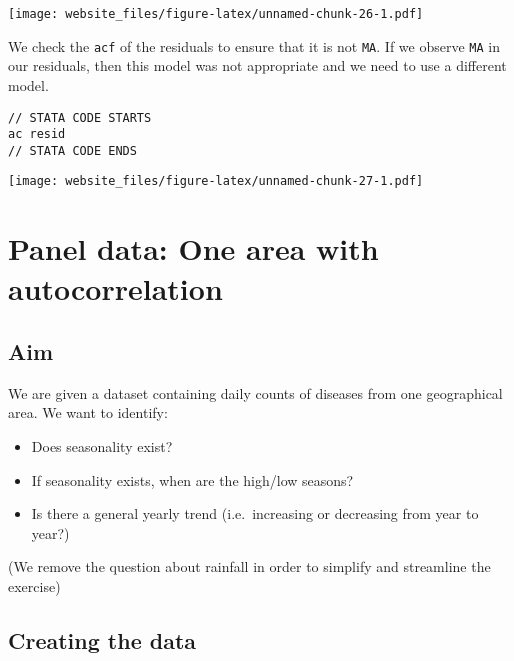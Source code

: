 \documentclass[]{book}
\newenvironment{Shaded}{\begin{snugshade}}{\end{snugshade}}
\newcommand{\KeywordTok}[1]{\textcolor[rgb]{0.13,0.29,0.53}{\textbf{#1}}}
\newcommand{\CommentTok}[1]{\textcolor[rgb]{0.56,0.35,0.01}{\textit{#1}}}
\newcommand{\OperatorTok}[1]{\textcolor[rgb]{0.81,0.36,0.00}{\textbf{#1}}}
\newcommand{\NormalTok}[1]{#1}
\providecommand{\tightlist}{%
  \setlength{\itemsep}{0pt}\setlength{\parskip}{0pt}}
\begin{document}
\texttt{[image: website\_files/figure-latex/unnamed-chunk-26-1.pdf]}

\newpage

We check the \texttt{acf} of the residuals to ensure that it is not
\texttt{MA}. If we observe \texttt{MA} in our residuals, then this model
was not appropriate and we need to use a different model.

\begin{verbatim}
// STATA CODE STARTS
ac resid
// STATA CODE ENDS
\end{verbatim}

\begin{Shaded}
\end{Shaded}

\texttt{[image: website\_files/figure-latex/unnamed-chunk-27-1.pdf]}

\chapter{Panel data: One area with
autocorrelation}\label{panel-data-one-area-with-autocorrelation}

\section{Aim}\label{aim-1}

We are given a dataset containing daily counts of diseases from one
geographical area. We want to identify:

\begin{itemize}
\tightlist
\item
  Does seasonality exist?
\item
  If seasonality exists, when are the high/low seasons?
\item
  Is there a general yearly trend (i.e.~increasing or decreasing from
  year to year?)
\end{itemize}

(We remove the question about rainfall in order to simplify and
streamline the exercise)

\newpage

\section{Creating the data}\label{creating-the-data-1}
\end{document}
